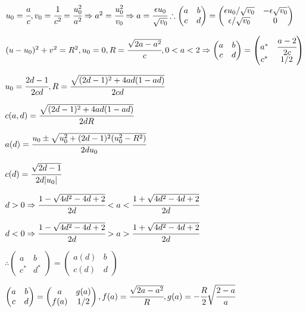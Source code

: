	$u_0 = \cfrac{a}{c}, v_0 = \cfrac{1}{c^2} = \cfrac{u_0^2}{a^2} \Rightarrow a^2 = \cfrac{u_0^2}{v_0} \Rightarrow a = \cfrac{\epsilon u_0}{\sqrt{v_0}} \therefore \left( \begin{matrix} a & b \\ c & d \end{matrix} \right) = \left( \begin{matrix} \epsilon u_0 / \sqrt{v_0} & - \epsilon \sqrt{v_0} \\ \epsilon/\sqrt{v_0} & 0 \end{matrix} \right)$

	$(u - u_0)^2 + v^2 = R^2, u_0 = 0, R = \cfrac{\sqrt{2a-a^2}}{c}, 0 < a < 2 \Rightarrow \left( \begin{matrix} a & b \\ c & d \end{matrix} \right) = \left( \begin{matrix} a^* & \cfrac{a-2}{2c} \\ c^* & 1/2 \end{matrix} \right)$

	$u_0 = \cfrac{2d - 1}{2cd}, R = \cfrac{\sqrt{(2d - 1)^2 + 4ad(1-ad)}}{2cd}$

	$c(a, d) = \cfrac{\sqrt{(2d - 1)^2 + 4ad(1-ad)}}{2dR}$

	$a(d) = \cfrac{u_0 \pm \sqrt{u_0^2 + (2d-1)^2(u_0^2 - R^2)}}{2d u_0}$

	$c(d) = \cfrac{\sqrt{2d - 1}}{2d |u_0|}$

	$d > 0 \Rightarrow \cfrac{1 - \sqrt{4d^2 - 4d + 2}}{2d} < a < \cfrac{1 + \sqrt{4d^2 - 4d + 2}}{2d}$

	$d < 0 \Rightarrow \cfrac{1 - \sqrt{4d^2 - 4d + 2}}{2d} > a > \cfrac{1 + \sqrt{4d^2 - 4d + 2}}{2d}$

	$\therefore \left( \begin{matrix} a & b \\ c^* & d^* \end{matrix} \right) = \left( \begin{matrix} a(d) & b \\ c(d) & d \end{matrix} \right)$

	\vspace{3mm}

	$\left( \begin{matrix} a & b \\ c & d \end{matrix} \right) = \left( \begin{matrix} a & g(a) \\ f(a) & 1/2 \end{matrix} \right), f(a) = \cfrac{\sqrt{2a - a^2}}{R}, g(a) = - \cfrac{R}{2} \sqrt{\cfrac{2-a}{a}}$

